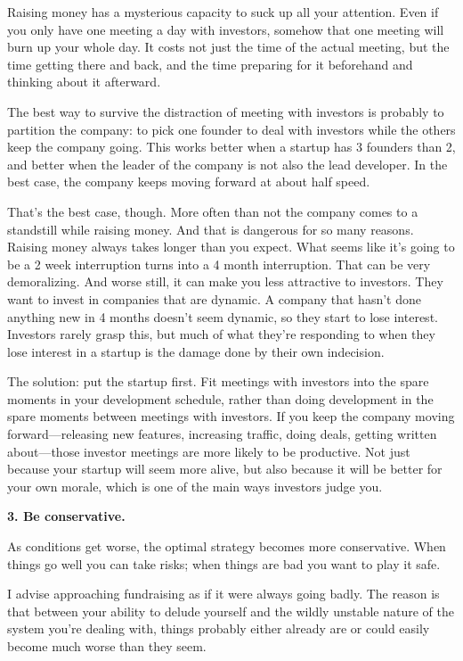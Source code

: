 Raising money has a mysterious capacity to suck up all your attention.
Even if you only have one meeting a day with investors, somehow that one
meeting will burn up your whole day. It costs not just the time of the
actual meeting, but the time getting there and back, and the time
preparing for it beforehand and thinking about it afterward.

The best way to survive the distraction of meeting with investors is
probably to partition the company: to pick one founder to deal with
investors while the others keep the company going. This works better
when a startup has 3 founders than 2, and better when the leader of the
company is not also the lead developer. In the best case, the company
keeps moving forward at about half speed.

That's the best case, though. More often than not the company comes to a
standstill while raising money. And that is dangerous for so many
reasons. Raising money always takes longer than you expect. What seems
like it's going to be a 2 week interruption turns into a 4 month
interruption. That can be very demoralizing. And worse still, it can
make you less attractive to investors. They want to invest in companies
that are dynamic. A company that hasn't done anything new in 4 months
doesn't seem dynamic, so they start to lose interest. Investors rarely
grasp this, but much of what they're responding to when they lose
interest in a startup is the damage done by their own indecision.

The solution: put the startup first. Fit meetings with investors into
the spare moments in your development schedule, rather than doing
development in the spare moments between meetings with investors. If you
keep the company moving forward---releasing new features, increasing
traffic, doing deals, getting written about---those investor meetings
are more likely to be productive. Not just because your startup will
seem more alive, but also because it will be better for your own morale,
which is one of the main ways investors judge you.

\textbf{3. Be conservative.}

As conditions get worse, the optimal strategy becomes more conservative.
When things go well you can take risks; when things are bad you want to
play it safe.

I advise approaching fundraising as if it were always going badly. The
reason is that between your ability to delude yourself and the wildly
unstable nature of the system you're dealing with, things probably
either already are or could easily become much worse than they seem.

